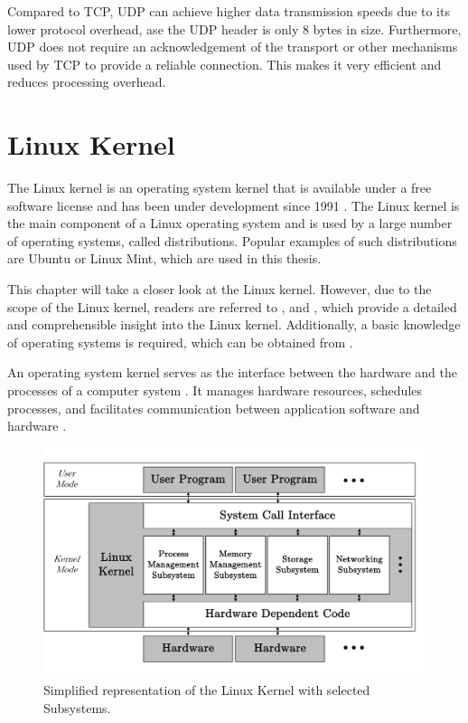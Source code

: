 Compared to TCP, UDP can achieve higher data transmission speeds due to its lower protocol overhead, ase the UDP header is only 8 bytes in size. Furthermore, UDP does not require an acknowledgement of the transport or other mechanisms used by TCP to provide a reliable connection. This makes it very efficient and reduces processing overhead.








\section{Linux Kernel}

The Linux kernel is an operating system kernel that is available under a free software license and has been under development since 1991 \cite{like01}. The Linux kernel is the main component of a Linux operating system and is used by a large number of operating systems, called distributions. Popular examples of such distributions are Ubuntu or Linux Mint, which are used in this thesis.

This chapter will take a closer look at the Linux kernel. However, due to the scope of the Linux kernel, readers are referred to \cite{like02}, \cite{like03} and \cite{like08}, which provide a detailed and comprehensible insight into the Linux kernel. Additionally, a basic knowledge of operating systems is required, which can be obtained from \cite{like05}.

An operating system kernel serves as the interface between the hardware and the processes of a computer system \cite{like04}. It manages hardware resources, schedules processes, and facilitates communication between application software and hardware \cite{like06}.

\begin{figure}[h]
    \centering
    \includegraphics[width=1\linewidth]{figures/linux_kernel/image01.pdf}
    \caption[Simplified representation of the Linux Kernel with selected Subsystems]{Simplified representation of the Linux Kernel with selected Subsystems.}
    \label{fig:LinuxKernel}
\end{figure}

